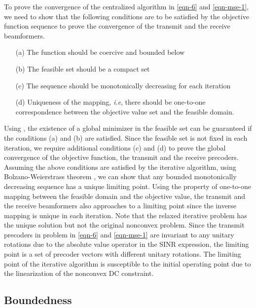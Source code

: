 \newcommand{\eqn}[1]{\(#1\)}
\newcommand{\mx}{\mbf{m}}
\newcommand{\my}{\mbf{w}}
\newcommand{\mz}{\mbfa{\gamma}}
\newcommand{\mxb}{{{\mbf{m}}}}
\newcommand{\myb}{{{\mbf{w}}}}
\newcommand{\iterate}[2]{{#1}^{(#2)}}
\newcommand{\iter}[3]{{#1}_{#2}^{(#3)}}

To prove the convergence of the centralized algorithm in \eqref{eqn-6} and \eqref{eqn-mse-1}, we need to show that the following conditions are to be satisfied by the objective function sequence to prove the convergence of the transmit and the receive beamformers.
\begin{itemize}
	\item[(a)] The function should be coercive and bounded below
	\item[(b)] The feasible set should be a compact set
	\item[(c)] The sequence should be monotonically decreasing for each iteration
	\item[(d)] Uniqueness of the mapping, \textit{i.e}, there should be one-to-one correspondence between the objective value set and the feasible domain.
\end{itemize}
Using \cite[Prop. A.8]{bertsekas1999nonlinear}, the existence of a global minimizer in the feasible set can be guaranteed if the conditions (a) and (b) are satisfied. Since the feasible set is not fixed in each iteration, we require additional conditions (c) and (d) to prove the global convergence of the objective function, the transmit and the receive precoders. Assuming the above conditions are satisfied by the iterative algorithm, using Bolzano-Weierstrass theorem \cite{rudin1964principles}, we can show that any bounded monotonically decreasing sequence has a unique limiting point. Using the property of one-to-one mapping between the feasible domain and the objective value, the transmit and the receive beamformers also approaches to a limiting point since the inverse mapping is unique in each iteration. Note that the relaxed iterative problem has the unique solution but not the original nonconvex problem. Since the transmit precoders in problem in \eqref{eqn-6} and \eqref{eqn-mse-1} are invariant to any unitary rotations due to the absolute value operator in the \ac{SINR} expression, the limiting point is a set of precoder vectors with different unitary rotations. The limiting point of the iterative algorithm is susceptible to the initial operating point due to the linearization of the nonconvex \ac{DC} constraint.

\subsection{Boundedness}

